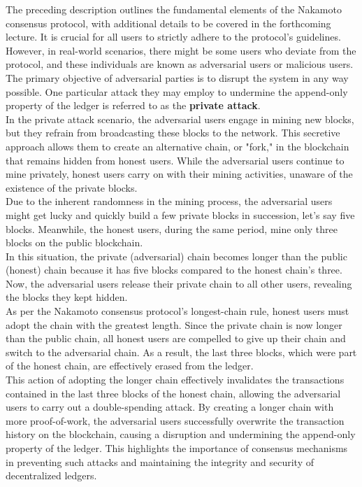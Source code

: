 \documentclass{report}
\begin{document}
The preceding description outlines the fundamental elements of the Nakamoto consensus protocol, with additional details to be covered in the forthcoming lecture. It is crucial for all users to strictly adhere to the protocol's guidelines. However, in real-world scenarios, there might be some users who deviate from the protocol, and these individuals are known as adversarial users or malicious users.\\
The primary objective of adversarial parties is to disrupt the system in any way possible. One particular attack they may employ to undermine the append-only property of the ledger is referred to as the \textbf{private attack}.\\
In the private attack scenario, the adversarial users engage in mining new blocks, but they refrain from broadcasting these blocks to the network. This secretive approach allows them to create an alternative chain, or "fork," in the blockchain that remains hidden from honest users. While the adversarial users continue to mine privately, honest users carry on with their mining activities, unaware of the existence of the private blocks.\\
Due to the inherent randomness in the mining process, the adversarial users might get lucky and quickly build a few private blocks in succession, let's say five blocks. Meanwhile, the honest users, during the same period, mine only three blocks on the public blockchain.\\

In this situation, the private (adversarial) chain becomes longer than the public (honest) chain because it has five blocks compared to the honest chain's three. Now, the adversarial users release their private chain to all other users, revealing the blocks they kept hidden.\\
As per the Nakamoto consensus protocol's longest-chain rule, honest users must adopt the chain with the greatest length. Since the private chain is now longer than the public chain, all honest users are compelled to give up their chain and switch to the adversarial chain. As a result, the last three blocks, which were part of the honest chain, are effectively erased from the ledger.\\
This action of adopting the longer chain effectively invalidates the transactions contained in the last three blocks of the honest chain, allowing the adversarial users to carry out a double-spending attack. By creating a longer chain with more proof-of-work, the adversarial users successfully overwrite the transaction history on the blockchain, causing a disruption and undermining the append-only property of the ledger. This highlights the importance of consensus mechanisms in preventing such attacks and maintaining the integrity and security of decentralized ledgers.
\end{document}

